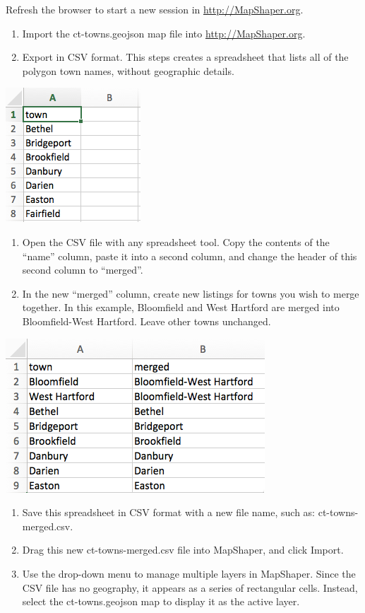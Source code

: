 \documentclass[
  english,
]{book}
\begin{document}
Refresh the browser to start a new session in \url{http://MapShaper.org}.

\begin{enumerate}
\def\labelenumi{\arabic{enumi}.}
\item
  Import the ct-towns.geojson map file into \url{http://MapShaper.org}.
\item
  Export in CSV format. This steps creates a spreadsheet that lists all of the polygon town names, without geographic details.
\end{enumerate}

\includegraphics{images/09-transform/towns-export-csv.png}

\begin{enumerate}
\def\labelenumi{\arabic{enumi}.}
\setcounter{enumi}{2}
\item
  Open the CSV file with any spreadsheet tool. Copy the contents of the ``name'' column, paste it into a second column, and change the header of this second column to ``merged''.
\item
  In the new ``merged'' column, create new listings for towns you wish to merge together. In this example, Bloomfield and West Hartford are merged into Bloomfield-West Hartford. Leave other towns unchanged.
\end{enumerate}

\includegraphics{images/09-transform/CT-towns-merged-csv.png}

\begin{enumerate}
\def\labelenumi{\arabic{enumi}.}
\setcounter{enumi}{4}
\item
  Save this spreadsheet in CSV format with a new file name, such as: ct-towns-merged.csv.
\item
  Drag this new ct-towns-merged.csv file into MapShaper, and click Import.
\item
  Use the drop-down menu to manage multiple layers in MapShaper. Since the CSV file has no geography, it appears as a series of rectangular cells. Instead, select the ct-towns.geojson map to display it as the active layer.
\end{enumerate}
\end{document}

